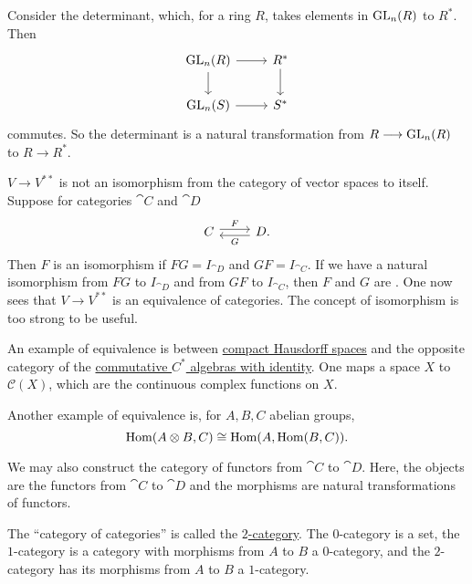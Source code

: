 \documentclass[11pt, twoside]{article}
\begin{document}
Consider the determinant, which, for a ring $R$, takes elements in $\operatorname{GL}_n(R) $ to $R^*$. Then
\[
\begin{tikzcd}
\GL_n(R) \arrow[r] \arrow[d] & R^* \arrow[d]\\ \GL_n(S)  \arrow[r] & S^*
\end{tikzcd}
\]
commutes. So the determinant is a natural transformation from $R\longrightarrow \operatorname{GL}_n(R)$ to $R\longrightarrow R^*$.

$V\longrightarrow V^{**}$ is not an isomorphism from the category of vector spaces to itself. Suppose for categories $\cat C$ and $\cat D$
\[
\begin{tikzcd}
\cat C \arrow[r, shift left, "F"] & \cat D. \arrow[l, shift left, "G"]
\end{tikzcd}
\]
Then $F$ is an isomorphism if $FG = I_{\cat D}$ and $GF = I_{\cat C}$. If we have a natural isomorphism from $FG$ to $I_{\cat D}$ and from $GF$ to $I_{\cat C}$, then $F$ and $G$ are \href{https://en.wikipedia.org/wiki/Equivalence_of_categories}{}. One now sees that $V\longrightarrow V^{**}$ is an equivalence of categories. The concept of isomorphism is too strong to be useful.

An example of equivalence is \href{https://en.wikipedia.org/wiki/Gelfand_representation}{} between \href{https://en.wikipedia.org/wiki/Compact_space}{\color{black}compact Hausdorff spaces} and the opposite category of the \href{https://en.wikipedia.org/wiki/C*-algebra}{\color{black}commutative $C^*$ algebras with identity}. One maps a space $X$ to $\mathscr{C}(X)$, which are the continuous complex functions on $X$.  %

Another example of equivalence is, for $A,B,C$ abelian groups, 
$$
\operatorname{Hom}(A\otimes B, C) \cong \operatorname{Hom}(A, \operatorname{Hom}(B,C)).
$$

We may also construct the category of functors from $\cat C$ to $\cat D$. Here, the objects are the functors from $\cat C$ to $\cat D$ and the morphisms are natural transformations of functors.

The ``category of categories'' is called the \href{https://en.wikipedia.org/wiki/Strict_2-category}{\color{black}$2$-category}. The $0$-category is a set, the $1$-category is a category with morphisms from $A$ to $B$ a $0$-category, and the $2$-category has its morphisms from $A$ to $B$ a $1$-category.  
\end{document}
